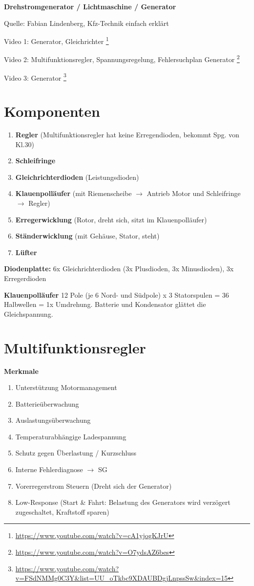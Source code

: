 \textbf{Drehstromgenerator / Lichtmaschine / Generator}

Quelle: Fabian Lindenberg, Kfz-Technik einfach erklärt

Video 1: Generator, Gleichrichter \footnote{\url{https://www.youtube.com/watch?v=cA1yjogKJrU}}

Video 2: Multifunktionsregler, Spannungsregelung, Fehlersuchplan
Generator \footnote{\url{https://www.youtube.com/watch?v=O7ydsAZ6bes}}

Video 3: Generator \footnote{\url{https://www.youtube.com/watch?v=FSdNMMg0C3Y\&list=UU_oTkbc9XDAUBDgjLnpssSw\&index=15}}

\section{Komponenten}\label{komponenten}

\begin{enumerate}
\item
  \textbf{Regler} (Multifunktionsregler hat keine Erregendioden, bekommt
  Spg. von Kl.30)
\item
  \textbf{Schleifringe}
\item
  \textbf{Gleichrichterdioden} (Leistungsdioden)
\item
  \textbf{Klauenpolläufer} (mit Riemenscheibe $\to$ Antrieb Motor und
  Schleifringe $\to$ Regler)
\item
  \textbf{Erregerwicklung} (Rotor, dreht sich, sitzt im Klauenpolläufer)
\item
  \textbf{Ständerwicklung} (mit Gehäuse, Stator, steht)
\item
  \textbf{Lüfter}
\end{enumerate}

\textbf{Diodenplatte:} 6x Gleichrichterdioden (3x Plusdioden, 3x
Minusdioden), 3x Erregerdioden

\textbf{Klauenpolläufer} 12 Pole (je 6 Nord- und Südpole) x 3
Statorspulen = 36 Halbwellen = 1x Umdrehung. Batterie und Kondensator
glättet die Gleichspannung.

\section{Multifunktionsregler}\label{multifunktionsregler}

\textbf{Merkmale}

\begin{enumerate}
\item
  Unterstützung Motormanagement
\item
  Batterieüberwachung
\item
  Auslastungsüberwachung
\item
  Temperaturabhängige Ladespannung
\item
  Schutz gegen Überlastung / Kurzschluss
\item
  Interne Fehlerdiagnose $\to$ SG
\item
  Vorerregerstrom Steuern (Dreht sich der Generator)
\item
  Low-Response (Start \& Fahrt: Belastung des Generators wird verzögert
  zugeschaltet, Kraftstoff sparen)
\end{enumerate}

